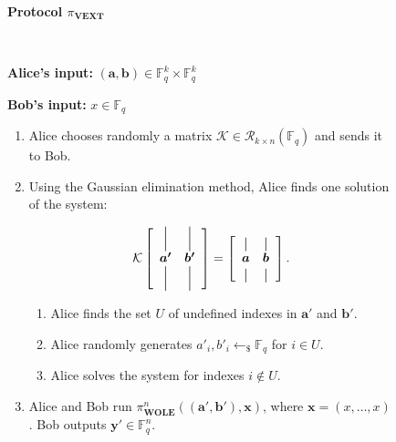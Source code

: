 \begin{figure}[h!]
    \centering
        \begin{tcolorbox}
            
            \centerline{\textbf{Protocol $\mathcal{\pi}_{\textbf{VEXT}}$}}
            
            \
    
    \textbf{Alice's input:} $(\bm{a}, \bm{b}) \in \mathbb{F}^k_q\times \mathbb{F}^k_q$ 
    
    \textbf{Bob's input:} $x\in \mathbb{F}_q$
    
\begin{enumerate}
    \item Alice chooses randomly a matrix $\mathcal{K} \in \mathcal{R}_{k\times n}(\mathbb{F}_q)$ and sends it to Bob.
    \item Using the Gaussian elimination method, Alice finds one solution of the system:
    
    \begin{equation*}
\mathcal{K} \left[
  \begin{array}{cc}
    \bigvertbar & \bigvertbar  \\
    \bm{a'} & \bm{b'} \\
    \bigvertbar  & \bigvertbar \\
  \end{array}
\right]  = \left[
  \begin{array}{cc}
    \vertbar & \vertbar\\
    \bm{a} & \bm{b}\\
    \vertbar & \vertbar\\
  \end{array}
\right].\\
\end{equation*}
    
    \begin{enumerate}
        \item Alice finds the set $U$ of undefined indexes in $\bm{a}'$ and $\bm{b}'$.
        \item Alice randomly generates $a'_i, b'_i \leftarrow_{\$}\mathbb{F}_q$ for $i\in U$.
        \item Alice solves the system for indexes $i\notin U$.
    \end{enumerate}
    \item Alice and Bob run $\mathcal{\pi}^n_{\textbf{WOLE}}((\bm{a}', \bm{b}'), \bm{x})$, where $\bm{x} = (x, \ldots, x)$. Bob outputs  $\bm{y}'\in \mathbb{F}_q^n$.
    

\end{enumerate}
\end{tcolorbox}
\end{figure}
